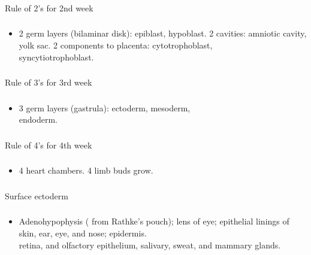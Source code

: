 \documentclass[11pt]{beamer}
\begin{document}
\begin{frame}
 \frametitle{}
Rule of 2’s for 2nd week
\end{frame}

\begin{frame}
 \frametitle{}
\begin{itemize}
\item{2 germ layers (bilaminar disk): epiblast, hypoblast. 2 cavities: amniotic cavity, yolk sac. 2 components to placenta: cytotrophoblast, \\ syncytiotrophoblast.}
\end{itemize}
\end{frame}

\begin{frame}
 \frametitle{}
Rule of 3’s for 3rd week
\end{frame}

\begin{frame}
 \frametitle{}
\begin{itemize}
\item{3 germ layers (gastrula): ectoderm, mesoderm, \\ endoderm.}
\end{itemize}
\end{frame}

\begin{frame}
 \frametitle{}
Rule of 4’s for 4th week
\end{frame}

\begin{frame}
 \frametitle{}
\begin{itemize}
\item{4 heart chambers. 4 limb buds grow.}
\end{itemize}
\end{frame}

\begin{frame}
 \frametitle{}
Surface ectoderm
\end{frame}

\begin{frame}
 \frametitle{}
\begin{itemize}
\item{Adenohypophysis ( from Rathke's pouch); lens of eye; epithelial linings of skin, ear, eye, and nose; epidermis. \\ retina, and olfactory epithelium, salivary, sweat, and mammary glands. }
\end{itemize}
\end{frame}
\end{document}
